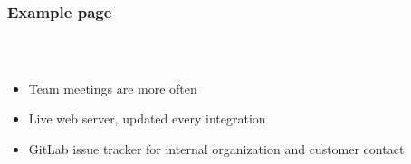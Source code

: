 
\begin{frame}
  \frametitle{Example page}
  \begin{columns}
  	\begin{column}{0.8\textwidth}
   	  \begin{description}[]
        \item[Workflow] \hfill \\
        \begin{itemize}
          \item Team meetings are more often
          \item Live web server, updated every integration
          \item GitLab issue tracker for internal organization and customer contact
        \end{itemize}
  

\end{description}
\end{column}
\end{columns}
\end{frame}

